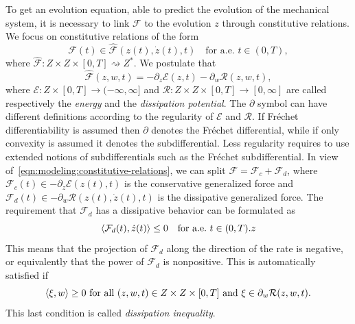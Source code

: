 \documentclass[a4paper,10pt,twoside]{amsbook}
\numberwithin{section}{chapter}
\numberwithin{equation}{chapter}
\theoremstyle{definition}
\DeclarePairedDelimiter{\dual}{\langle}{\rangle}
\begin{document}
To get an evolution equation, able to predict the evolution of the mechanical system, it is necessary to link $\mathcal{F}$ to the evolution $z$ through constitutive relations. We focus on constitutive relations of the form
\[
\mathcal{F}(t)\in\hat{\mathcal{F}}(z(t),\dot{z}(t),t)\quad\text{for a.e.\ $t\in(0,T)$},
\]
where $\hat{\mathcal{F}}\colon Z\times Z\times[0,T]\rightsquigarrow Z^*$. We postulate that
\begin{equation}
\label{eqn:modeling:constitutive-relations}
\hat{\mathcal{F}}(z,w,t)=-\partial_z\mathcal{E}(z,t)-\partial_w\mathcal{R}(z,w,t),
\end{equation}
where $\mathcal{E}\colon Z\times[0,T]\to(-\infty,\infty]$ and $\mathcal{R}\colon Z\times Z\times[0,T]\to[0,\infty]$ are called respectively the \emph{energy} and the \emph{dissipation potential}. The $\partial$ symbol can have different definitions according to the regularity of $\mathcal{E}$ and $\mathcal{R}$. If Fréchet differentiability is assumed then $\partial$ denotes the Fréchet differential, while if only convexity is assumed it denotes the subdifferential. Less regularity requires to use extended notions of subdifferentials such as the Fréchet subdifferential. In view of~\eqref{eqn:modeling:constitutive-relations}, we can split $\mathcal{F}=\mathcal{F}_c+\mathcal{F}_d$, where $\mathcal{F}_c(t)\in-\partial_z\mathcal{E}(z(t),t)$ is the conservative generalized force and $\mathcal{F}_d(t)\in-\partial_w\mathcal{R}(z(t),\dot{z}(t),t)$ is the dissipative generalized force. The requirement that $\mathcal{F}_d$ has a dissipative behavior can be formulated as
\[
\dual{\mathcal{F}_d(t),\dot{z}(t)}\le0\quad\text{for a.e.\ $t\in(0,T)$}.z
\]
This means that the projection of $\mathcal{F}_d$ along the direction of the rate is negative, or equivalently that the power of $\mathcal{F}_d$ is nonpositive. This is automatically satisfied if
\[
\text{$\dual{\xi,w}\ge0$ for all $(z,w,t)\in Z\times Z\times[0,T]$ and $\xi\in\partial_w\mathcal{R}(z,w,t)$}.
\]
This last condition is called \emph{dissipation inequality}.
\end{document}

